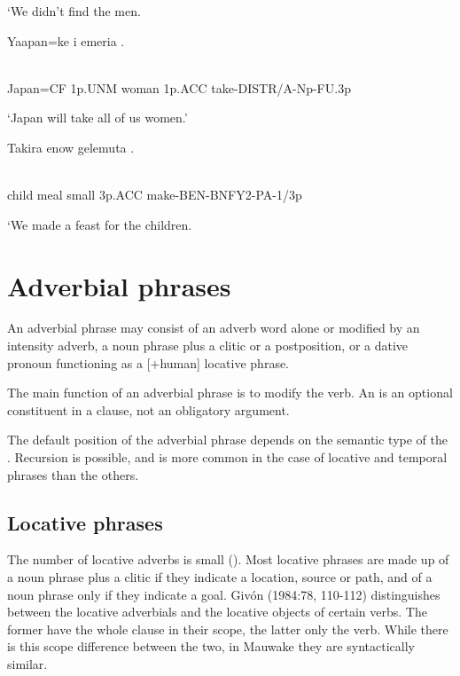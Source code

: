 `We didn't find the men.

\ea%
\label{ex:x850}
\gll Yaapan=ke  i  emeria  . \\
      \\
\glt
\z

Japan=CF  1p.UNM  woman  1p.ACC  take-DISTR/A-Np-FU.3p

`Japan will take all of us women.'

\ea%
\label{ex:x851}
\gll Takira  enow  gelemuta  . \\
      \\
\glt
\z

child  meal  small  3p.ACC  make-BEN-BNFY2-PA-1/3p

`We made a feast for the children.

\section{Adverbial phrases}
\hypertarget{RefHeading21821935131865}{}
An adverbial phrase may consist of an adverb word alone or modified by an intensity adverb, a noun phrase plus a clitic or a postposition, or a dative pronoun functioning as a [+human] locative phrase.

The main function of an adverbial phrase is to modify the verb. An  is an optional constituent in a clause, not an obligatory argument. 

The default position of the adverbial phrase depends on the semantic type of the . Recursion is possible, and is more common in the case of locative and temporal phrases than the others.

\subsection{Locative phrases}
\hypertarget{RefHeading21841935131865}{}
The number of locative adverbs is small (). Most locative phrases are made up of a noun phrase plus a clitic if they indicate a location, source or path, and of a noun phrase only if they indicate a goal. Giv\'on (1984:78, 110-112) distinguishes between the locative adverbials and the locative objects of certain verbs. The former have the whole clause in their scope, the latter only the verb. While there is this scope difference between the two, in Mauwake they are syntactically similar. 

